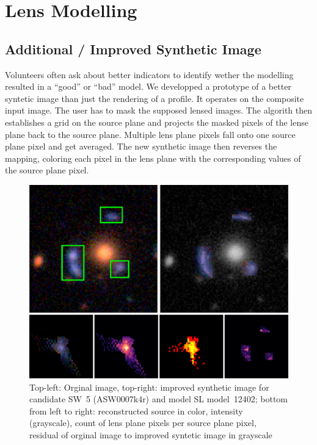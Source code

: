 \documentclass[fleqn,usenatbib]{mnras}
\newcommand{\asw}[1]{ASW000#1}
\newcommand{\sw}[1]{SW~#1}
\newcommand{\model}[1]{SL model~#1}
\begin{document}
\section{Lens Modelling}


\subsection{Additional / Improved Synthetic Image}

Volunteers often ask about better indicators to identify wether the modelling resulted in a ``good'' or ``bad'' model.
We developped a prototype of a better syntetic image than just the rendering of a  profile.
It operates on the composite input image.
The user has to mask the supposed lensed images.
The algorith then establishes a grid on the source plane and projects the masked pixels of the lense plane back to the source plane.
Multiple lens plane pixels fall onto one source plane pixel and get averaged.
The new synthetic image then reverses the mapping, coloring each pixel in the lens plane with the corresponding values of the source plane pixel.

\begin{figure}
  \includegraphics[width=\linewidth]{img/new_synth_img_detailed}
  \caption{
      Top-left: Orginal image, top-right: improved synthetic image for candidate \sw{5} (\asw{7k4r}) and model \model{12402};
      bottom from left to right:
        reconstructed source in color,
        intensity (grayscale),
        count of lens plane pixels per source plane pixel,
        residual of orginal image to improved syntetic image in grayscale
    }
  \label{fig:synthimg}
\end{figure}
\end{document}
